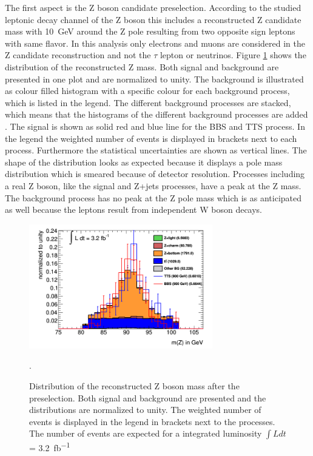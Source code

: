 The first aspect is the Z boson candidate preselection. 
According to the studied leptonic decay channel of the Z boson this includes a reconstructed Z candidate mass with \SI{10}{GeV} around the Z pole resulting from two opposite sign leptons with same flavor.
In this analysis only electrons and muons are considered in the Z candidate reconstruction and not the $\tau$ lepton or neutrinos.
Figure \ref{Zmass} shows the distribution of the reconstructed Z mass. 
Both signal and background are presented in one plot and are normalized to unity. 
The background is illustrated as colour filled histogram with a specific colour for each background process, which is listed in the legend.
The different background processes are stacked, which means that the histograms of the different background processes are added . 
The signal is shown as solid red and blue line for the BBS and TTS process.
In the legend the weighted number of events is displayed in brackets next to each process.
Furthermore the statistical uncertainties are shown as vertical lines.
The shape of the distribution looks as expected because it displays a pole mass distribution which is smeared because of detector resolution.
Processes including a real Z boson, like the signal and Z+jets processes, have a peak at the Z mass. 
The \ttbar{} background process has no peak at the Z pole mass which is as anticipated as well because the leptons result from independent W boson decays.\\

\begin{figure}
\centering
\includegraphics[width=8cm]{figures/Zmass.png}
\caption{Distribution of the reconstructed Z boson mass after the preselection. 
Both signal and background are presented and the distributions are normalized to unity.
The weighted number of events is displayed in the legend in brackets next to the processes. 
The number of events are expected for a integrated luminosity $\int{Ldt}$ = \SI{3,2}{fb^{-1}} }.
\label{Zmass}
\end{figure}


